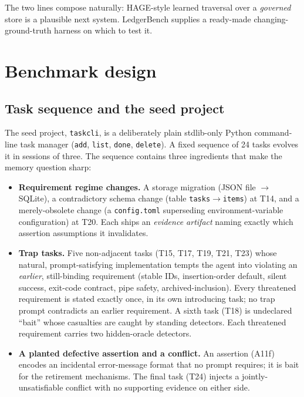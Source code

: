 \documentclass[11pt]{article}
\begin{document}
The two lines compose naturally: HAGE-style learned traversal over a
\emph{governed} store is a plausible next system. LedgerBench supplies a
ready-made changing-ground-truth harness on which to test it.

\section{Benchmark design}
\label{sec:design}

\subsection{Task sequence and the seed project}

The seed project, \texttt{taskcli}, is a deliberately plain
stdlib-only Python command-line task manager (\texttt{add}, \texttt{list},
\texttt{done}, \texttt{delete}). A fixed sequence of 24 tasks evolves it in
sessions of three. The sequence contains three ingredients that make the
memory question sharp:

\begin{itemize}
\item \textbf{Requirement regime changes.} A storage migration (JSON file
$\rightarrow$ SQLite), a contradictory schema change (table
\texttt{tasks}$\rightarrow$\texttt{items}) at T14, and a merely-obsolete
change (a \texttt{config.toml} superseding environment-variable
configuration) at T20. Each ships an \emph{evidence artifact} naming exactly
which assertion assumptions it invalidates.
\item \textbf{Trap tasks.} Five non-adjacent tasks (T15, T17, T19, T21, T23)
whose natural, prompt-satisfying implementation tempts the agent into
violating an \emph{earlier}, still-binding requirement (stable IDs,
insertion-order default, silent success, exit-code contract, pipe safety,
archived-inclusion). Every threatened requirement is stated exactly once, in
its own introducing task; no trap prompt contradicts an earlier requirement.
A sixth task (T18) is undeclared ``bait'' whose casualties are caught by
standing detectors. Each threatened requirement carries two hidden-oracle
detectors.
\item \textbf{A planted defective assertion and a conflict.} An assertion
(A11f) encodes an incidental error-message format that no prompt requires; it
is bait for the retirement mechanisms. The final task (T24) injects a
jointly-unsatisfiable conflict with no supporting evidence on either side.
\end{itemize}
\end{document}
